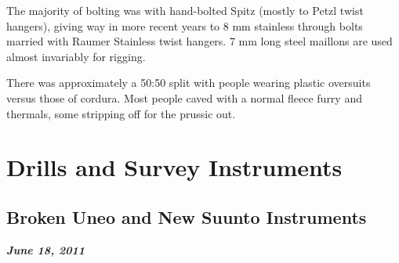 The majority of bolting was with hand-bolted Spitz (mostly to Petzl
twist hangers), giving way in more recent years to 8 mm stainless through
bolts married with Raumer Stainless twist hangers. 7 mm long steel
maillons are used almost invariably for rigging.

There was approximately a 50:50 split with people wearing plastic
oversuits versus those of cordura. Most people caved with a normal
fleece furry and thermals, some stripping off for the prussic out.


\newpage




\section{Drills and Survey Instruments}


\subsection{Broken Uneo and New Suunto Instruments}
\textbf{\textit{June 18, 2011}}

